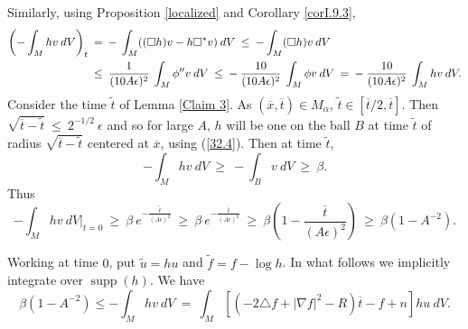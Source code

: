 \documentclass[12pt]{amsart}
\newcommand{\supp}{\operatorname{supp}}
\numberwithin{equation}{section}
\theoremstyle{plain}
\theoremstyle{definition}
\theoremstyle{remark}
\begin{document}
Similarly, using Proposition \ref{localized} and Corollary \ref{corI.9.3},
\begin{align}
\left(- \int_M hv \: dV \right)_t \: & = \: - \: \int_M 
((\square h) v - h \square^* v) \: dV \: \le \: - \int_M (\square h) v 
\: dV \\
& \le \:
\frac{1}{(10A\epsilon)^2} \: \int_M \phi^{\prime \prime} v \: dV \: \le \: - \:
\frac{10}{(10A\epsilon)^2} \: \int_M \phi v \: dV \: = \: - \:
\frac{10}{(10A\epsilon)^2} \: \int_M h v \: dV. \notag
\end{align}
Consider the time $\widetilde{t}$ of Lemma \ref{Claim 3}. As 
$(\overline{x}, \overline{t}) \in M_\alpha$, 
$\widetilde{t} \in
[\overline{t}/2, \overline{t}]$. Then $\sqrt{\overline{t} - 
\widetilde{t}} \: \le \: 2^{-1/2} \: \epsilon$ and so for large $A$,
$h$ will be one on the ball $B$
at time $\widetilde{t}$ of radius $\sqrt{\overline{t} - 
\widetilde{t}}$ centered at $\overline{x}$, using
(\ref{32.4}). Then at time $\widetilde{t}$,
\begin{equation}
- \int_M hv \: dV \: \ge \: - \int_B v \: dV \: \ge \: \beta.
\end{equation}
Thus
\begin{equation}
- \int_M hv \: dV \Big|_{t=0} \: \ge \: \beta \: e^{- 
\frac{\widetilde{t}}{(A\epsilon)^2}} \: \ge \:
\beta \: e^{- \frac{\overline{t}}{(A\epsilon)^2}} \: \ge \: \beta 
\left( 1 - \frac{\overline{t}}{(A \epsilon)^2} \right)
\: \ge \: \beta (1 - A^{-2}).  
\end{equation}

Working at time $0$, put $\widetilde{u} = hu$ and
$\widetilde{f} = f - \log h$.
In what follows we implicitly integrate over $\supp(h)$.
We have
\begin{equation}
\beta (1 - A^{-2}) \le - \int_M hv \: dV \: = \:
\int_M [(-2\triangle f + |\nabla f|^2 - R) \overline{t}
- f + n]hu \: dV.
\end{equation}
\end{document}
